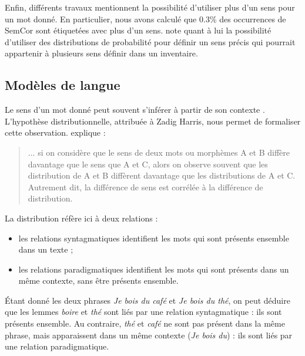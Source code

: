 Enfin, différents travaux mentionnent la possibilité d'utiliser plus d'un sens
pour un mot donné.
En particulier, nous avons calculé que 0.3\% des occurrences de SemCor sont
étiquetées avec plus d'un sens. \cite{smith2011rumble} note quant à lui la
possibilité d'utiliser des distributions de probabilité pour définir un sens
précis qui pourrait appartenir à plusieurs sens définir dans un inventaire.


\subsection{Modèles de langue}
\label{subsec:modeles_de_langue}


Le sens d'un mot donné peut souvent s'inférer à partir de son contexte
\citep{pantel2002discovering}. L'hypothèse distributionnelle, attribuée à Zadig
Harris, nous permet de formaliser cette observation.
\cite[p.~786]{harris1954distributional} explique :

\begin{quote} ... si on considère que le sens de deux mots ou morphèmes A et B
    diffère davantage que le sens que A et C, alors on observe souvent que les
    distribution de A et B diffèrent davantage que les distributions de A et C.
    Autrement dit, la différence de sens est corrélée à la différence de
    distribution.\end{quote}

La distribution réfère ici à deux relations \citep{sahlgren2008distributional}
:

\begin{itemize}

    \item les relations syntagmatiques identifient les mots qui sont présents
        ensemble dans un texte ;

    \item les relations paradigmatiques identifient les mots qui sont présents
        dans un même contexte, sans être présents ensemble.

\end{itemize}

Étant donné les deux phrases \emph{Je bois du café} et \emph{Je bois du thé},
on peut déduire que les lemmes \emph{boire} et \emph{thé} sont liés par une
relation syntagmatique : ils sont présents ensemble. Au contraire, \emph{thé}
et \emph{café} ne sont pas présent dans la même phrase, mais apparaissent dans
un même contexte (\emph{Je bois du}) : ils sont liés par une relation
paradigmatique.

